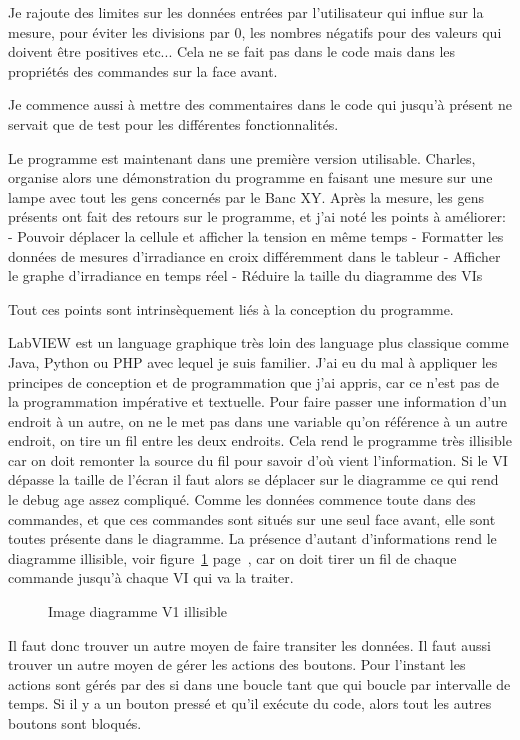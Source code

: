 \documentclass[a4paper, 12pt]{article}
\begin{document}
Je rajoute des limites sur les données entrées par l'utilisateur qui influe sur la mesure, pour éviter les divisions par 0, les nombres négatifs pour des valeurs qui doivent être positives etc... Cela ne se fait pas dans le code mais dans les propriétés des commandes sur la face avant.

Je commence aussi à mettre des commentaires dans le code qui jusqu'à présent ne servait que de test pour les différentes fonctionnalités.

Le programme est maintenant dans une première version utilisable.  Charles, organise alors une démonstration du programme en faisant une mesure sur une lampe avec tout les gens concernés par le Banc XY.
Après la mesure, les gens présents ont fait des retours sur le programme, et j'ai noté les points à améliorer:
- Pouvoir déplacer la cellule et afficher la tension en même temps
- Formatter les données de mesures d'irradiance en croix différemment dans le tableur
- Afficher le graphe d'irradiance en temps réel
- Réduire la taille du diagramme des VIs

Tout ces points sont intrinsèquement liés à la conception du programme.

LabVIEW est un language graphique très loin des language plus classique comme Java, Python ou PHP avec lequel je suis familier.
J'ai eu du mal à appliquer les principes de conception et de programmation que j'ai appris, car ce n'est pas de la programmation impérative et textuelle.
Pour faire passer une information d'un endroit à un autre, on ne le met pas dans une variable qu'on référence à un autre endroit, on tire un fil entre les deux endroits. 
Cela rend le programme très illisible car on doit remonter la source du fil pour savoir d'où vient l'information.
Si le VI dépasse la taille de l'écran il faut alors se déplacer sur le diagramme ce qui rend le debug age assez compliqué.
Comme les données commence toute dans des commandes, et que ces commandes sont situés sur une seul face avant, elle sont toutes présente dans le diagramme.
La présence d'autant d'informations rend le diagramme illisible, voir figure~\ref{fig:diagrammeV1} page~\pageref{fig:diagrammeV1}, car on doit tirer un fil de chaque commande jusqu'à chaque VI qui va la traiter.

\begin{figure}[p]
	\centering
	\caption{Image diagramme V1 illisible}
	\label{fig:diagrammeV1}
\end{figure}


Il faut donc trouver un autre moyen de faire transiter les données.
Il faut aussi trouver un autre moyen de gérer les actions des boutons.
Pour l'instant les actions sont gérés par des si dans une boucle tant que qui boucle par intervalle de temps. Si il y a un bouton pressé et qu'il exécute du code, alors tout les autres boutons sont bloqués.
\end{document}
